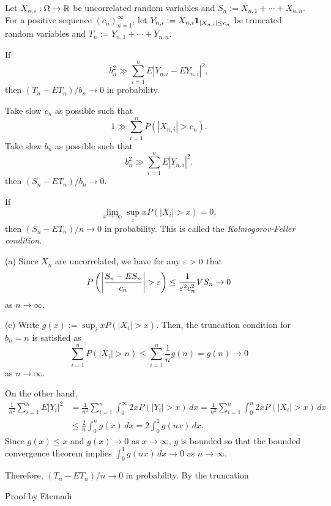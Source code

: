 \documentclass{../note}
\begin{document}
\begin{prb}
Let $X_{n,i}:\Omega\to\mathbb{R}$ be uncorrelated random variables and $S_n:=X_{n,1}+\cdots+X_{n,n}$.
For a positive sequence $(c_n)_{n=1}^\infty$, let $Y_{n,i}:=X_{n,i}\mathbf{1}_{|X_{n,i}|\le c_n}$ be truncated random variables and $T_n:=Y_{n,1}+\cdots+Y_{n,n}$.

\begin{parts}
\item If
\[b_n^2\gg\sum_{i=1}^nE|Y_{n,i}-EY_{n,i}|^2,\]
then $(T_n-ET_n)/b_n\to0$ in probability.

\item Take slow $c_n$ as possible such that
\[1\gg\sum_{i=1}^nP(|X_{n,i}|>c_n).\]
Take slow $b_n$ as possible such that
\[b_n^2\gg\sum_{i=1}^nE|Y_{n,i}|^2.\]
then $(S_n-ET_n)/b_n\to0$.

\item If
\[\lim_{x\to\infty}\sup_ixP(|X_i|>x)=0,\]
then $(S_n-ET_n)/n\to0$ in probability.
This is called the \emph{Kolmogorov-Feller condition}.
\end{parts}
\end{prb}
\begin{pf}
(a)
Since $X_n$ are uncorrelated, we have for any $\varepsilon>0$ that
\[P\left(\left|\frac{S_n-ES_n}{c_n}\right|>\e\right)\le\frac1{\e^2c_n^2}VS_n\to0\]
as $n\to\infty$.

(c)
Write $g(x):=\sup_ixP(|X_i|>x)$.
Then, the truncation condition for $b_n=n$ is satisfied as
\[\sum_{i=1}^nP(|X_i|>n)\le\sum_{i=1}^n\frac1ng(n)=g(n)\to0\]
as $n\to\infty$.

On the other hand,
\begin{align*}
\frac1{n^2}\sum_{i=1}^nE|Y_i|^2
&=\frac1{n^2}\sum_{i=1}^n\int_0^\infty2xP(|Y_i|>x)\,dx
=\frac1{n^2}\sum_{i=1}^n\int_0^n2xP(|X_i|>x)\,dx\\
&\le\frac2n\int_0^ng(x)\,dx
=2\int_0^1g(nx)\,dx.
\end{align*}
Since $g(x)\le x$ and $g(x)\to0$ as $x\to\infty$, $g$ is bounded so that the bounded convergence theorem implies $\int_0^1g(nx)\,dx\to0$ as $n\to\infty$.

Therefore, $(T_n-ET_n)/n\to0$ in probability.
By the truncation
\end{pf}



\begin{prb}
\end{prb}

\begin{prb}
Proof by Etemadi
\end{prb}
\end{document}
